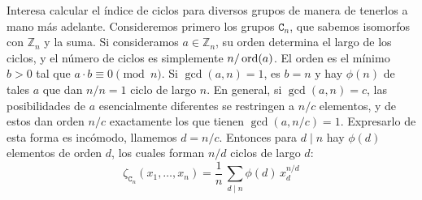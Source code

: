   Interesa calcular el índice de ciclos para diversos grupos
  de manera de tenerlos a mano más adelante.
  Consideremos primero los grupos \(\mathtt{C}_n\),%
  que sabemos isomorfos con \(\mathbb{Z}_n\) y la suma.
  Si consideramos \(a \in \mathbb{Z}_n\),
  su orden determina el largo de los ciclos,
  y el número de ciclos es simplemente \(n / \operatorname{ord}(a)\).
  El orden es el mínimo \(b > 0\)
  tal que \(a \cdot b \equiv 0 \pmod{n}\).
  Si \(\gcd(a, n) = 1\),
  es \(b = n\) y
  hay \(\phi(n)\) de tales \(a\)
  que dan \(n / n = 1\) ciclo de largo \(n\).
  En general,
  si \(\gcd(a, n) = c\),
  las posibilidades de \(a\) esencialmente diferentes
  se restringen a \(n / c\) elementos,
  y de estos dan orden \(n / c\)
  exactamente los que tienen \(\gcd(a, n / c) = 1\).
  Expresarlo de esta forma es incómodo,
  llamemos \(d = n / c\).
  Entonces para \(d \mid n\) hay \(\phi(d)\) elementos
  de orden \(d\),
  los cuales forman \(n / d\) ciclos de largo \(d\):
  \begin{equation*}
    \zeta_{\mathtt{C}_n} (x_1, \dotsc, x_n)
      = \frac{1}{n} \,
	  \sum_{d \mid n} \phi(d) \, x_d^{n / d}
  \end{equation*}

